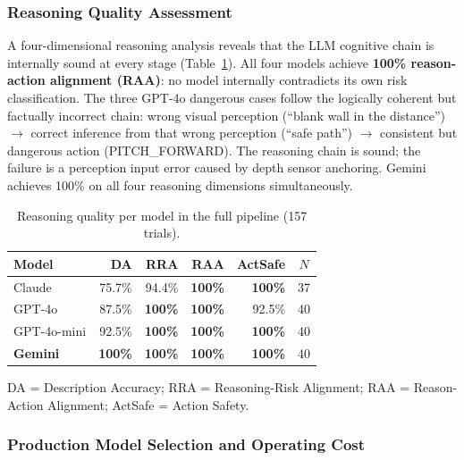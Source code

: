 \documentclass[journal]{IEEEtran}
\begin{document}
\subsubsection{Reasoning Quality Assessment}

A four-dimensional reasoning analysis reveals that the LLM cognitive
chain is internally sound at every stage
(Table~\ref{tab:reasoning}).
All four models achieve \textbf{100\% reason-action alignment (RAA)}: no
model internally contradicts its own risk classification.
The three GPT-4o dangerous cases follow the logically coherent but
factually incorrect chain: wrong visual perception (``blank wall in the
distance'') $\to$ correct inference from that wrong perception (``safe
path'') $\to$ consistent but dangerous action (PITCH\_FORWARD).
The reasoning chain is sound; the failure is a perception input error
caused by depth sensor anchoring.
Gemini achieves 100\% on all four reasoning dimensions simultaneously.

\begin{table}[!t]
  \caption{Reasoning quality per model in the full pipeline (157 trials).}
  \label{tab:reasoning}
  \centering
  \small
  \begin{tabular}{lrrrrc}
    \toprule
    Model & DA & RRA & RAA & ActSafe & $N$ \\
    \midrule
    Claude          & 75.7\% & 94.4\%         & \textbf{100\%} & \textbf{100\%} & 37 \\
    GPT-4o          & 87.5\% & \textbf{100\%} & \textbf{100\%} & 92.5\%         & 40 \\
    GPT-4o-mini     & 92.5\% & \textbf{100\%} & \textbf{100\%} & \textbf{100\%} & 40 \\
    \textbf{Gemini} & \textbf{100\%} & \textbf{100\%} & \textbf{100\%} & \textbf{100\%} & 40 \\
    \bottomrule
  \end{tabular}
  \vspace{2pt}
  \small DA = Description Accuracy; RRA = Reasoning-Risk Alignment;
  RAA = Reason-Action Alignment; ActSafe = Action Safety.
\end{table}

\subsubsection{Production Model Selection and Operating Cost}
\end{document}

